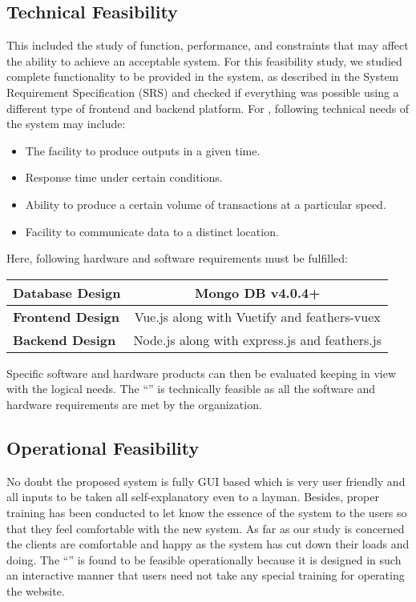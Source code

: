 		\subsection{Technical Feasibility}
		\vs
		\hspace{1cm}This included the study of function, performance, and constraints that may affect the ability to achieve an acceptable system. For this feasibility study, we studied complete functionality to be provided in the system, as described in the System Requirement Specification (SRS) and checked if everything was possible using a different type of frontend and backend platform.
		\vs
		For \projectname, following technical needs of the system may include:
		\begin{itemize}
			\item The facility to produce outputs in a given time. 
			\item Response time under certain conditions. 
			\item Ability to produce a certain volume of transactions at a particular speed. 
			\item Facility to communicate data to a distinct location. 
		\end{itemize}
		\vs
		Here, following hardware and software requirements must be fulfilled:
		\vs
					\bgroup
		\def\arraystretch{2}%
			\begin{tabular}{|m{5cm}|c|}
			\hline
			\textbf{Database Design} & Mongo DB v4.0.4+ \\
			\hline
			\textbf{Frontend Design} & Vue.js along with Vuetify and feathers-vuex \\
			\hline
			\textbf{Backend Design} & Node.js  along with express.js and feathers.js \\
			\hline
		\end{tabular}
	\egroup
		\vs
		Specific software and hardware products can then be evaluated keeping in view with the logical needs. The “\projectname” is technically feasible as all the software and hardware requirements are met by the organization.
		\vs
		\subsection{Operational Feasibility}
		\vs
		\hspace{1cm}No doubt the proposed system is fully GUI based which is very user friendly and all inputs to be taken all self-explanatory even to a layman. Besides, proper training has been conducted to let know the essence of the system to the users so that they feel comfortable with the new system. As far as our study is concerned the clients are comfortable and happy as the system has cut down their loads and doing.
		\vs
		 The “\projectname” is found to be feasible operationally because it is designed in such an interactive manner that users need not take any special training for operating the website.
		 \vs
